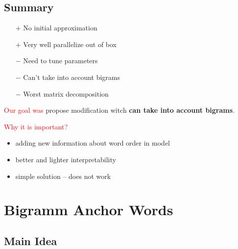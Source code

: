 \documentclass{beamer}
\begin{document}
\subsection*{Summary}
\begin{frame}
	\begin{itemize}
		\item[$+$] No initial approximation
		\item[$+$] Very well parallelize out of box
		
		\item[$-$] Need to tune parameters
		\item[$-$] Can't take into account bigrams
		\item[$-$] Worst matrix decomposition
	\end{itemize}	
	
	\vspace{0.5cm}
	\textcolor{red}{Our goal was} propose modification witch \textbf{can take into account bigrams}.
	
	\vspace{0.5cm}
	\textcolor{red}{Why it is important?} 
	\begin{itemize}
		\item adding new information about word order in model
		\item better and lighter interpretability 
		\item simple solution -- does not work
	\end{itemize}
	 
\end{frame}

\section*{Bigramm Anchor Words}
\subsection*{Main Idea}
\end{document}
